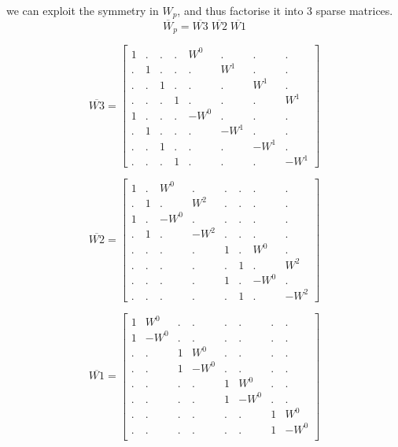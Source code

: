 \documentclass[journal,12pt,twocolumn]{IEEEtran}
\begin{document}
 we can exploit the symmetry in $W_{p}$, and thus factorise it into 3 sparse matrices.
\begin{equation}
    \overline{W}_{p} = \overline{W3} \; \overline{W2}\;\overline{W1}
\end{equation}


\begin{equation}
\overline{W3}
=
\begin{bmatrix}

1&.&.&.&W^{0}&.&.&. \\
.&1&.&.&.&W^{1}&.&. \\
.&.&1&.&.&.&W^{1}&. \\
.&.&.&1&.&.&.&W^{1} \\
1&.&.&.&-W^{0}&.&.&. \\
.&1&.&.&.&-W^{1}&.&. \\
.&.&1&.&.&.&-W^{1}&. \\
.&.&.&1&.&.&.&-W^{1} 

\end{bmatrix}
\end{equation}

\begin{equation}
\overline{W2}
=
\begin{bmatrix}
1&.&W^{0}&.&.&.&.&.\\
.&1&.&W^{2}&.&.&.&.\\
1&.&-W^{0}&.&.&.&.&.\\
.&1&.&-W^{2}&.&.&.&.\\
.&.&.&.&1&.&W^{0}&.\\
.&.&.&.&.&1&.&W^{2}\\
.&.&.&.&1&.&-W^{0}&.\\
.&.&.&.&.&1&.&-W^{2} 
\end{bmatrix}
\end{equation}

\begin{equation}
\overline{W1}
=
\begin{bmatrix}
1&W^{0}&.&.&.&.&.&. \\
1&-W^{0}&.&.&.&.&.&. \\
.&.&1&W^{0}&.&.&.&.\\
.&.&1&-W^{0}&.&.&.&.\\
.&.&.&.&1&W^{0}&.&.\\
.&.&.&.&1&-W^{0}&.&.\\
.&.&.&.&.&.&1&W^{0}\\
.&.&.&.&.&.&1&-W^{0}\\

\end{bmatrix}
\end{equation}
\end{document}
